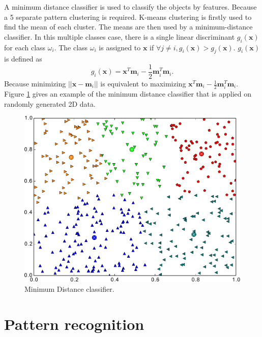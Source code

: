 \documentclass[paper=a4, fontsize=11pt]{scrartcl}
\begin{document}
A minimum distance classifier is used to classify the objects by features.
Because a 5 separate pattern clustering is required.
K-means clustering is firstly used to find the mean of each cluster.
The means are then used by a minimum-distance classifier.
In this multiple classes case, there is a single linear discriminant $ g_{i} ( \mathbf{x} ) $ for each class $ \omega_{i} $.
The class $ \omega_{i} $ is assigned to $ \mathbf{x} $ if $ \forall j \neq i, g_{i} ( \mathbf{x} ) > g_{j} ( \mathbf{x} ) $.
$ g_{i}( \mathbf{x} ) $ is defined as 
\begin{equation}
g_{i}( \mathbf{x} ) = \mathbf{x}^{T} \mathbf{m}_{i} - \frac{1}{2} \mathbf{m}_{i}^{T} \mathbf{m}_{i}.
\end{equation}
Because minimizing $ || \mathbf{x} - \mathbf{m}_{i} || $ is equivalent to maximizing $ \mathbf{x}^{T} \mathbf{m}_{i} - \frac{1}{2} \mathbf{m}_{i}^{T} \mathbf{m}_{i} $.
Figure \ref{fig:min_dist_classifer} gives an example of the minimum distance classifier that is applied on randomly generated 2D data.

\begin{figure}
\centering
\includegraphics[width=0.7\linewidth]{./figure/kmean}
\caption{Minimum Distance classifier.}
\label{fig:min_dist_classifer}
\end{figure}

\section{Pattern recognition}
\label{sec:pattern_recognition}
\end{document}
